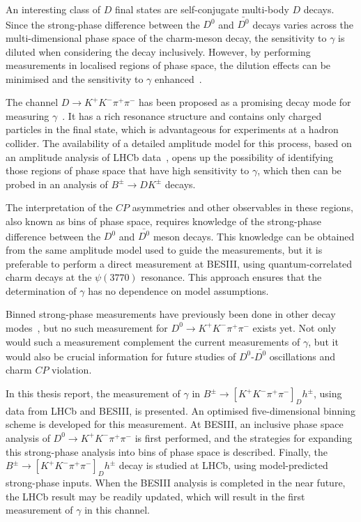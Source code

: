 \documentclass[12pt, a4paper, notitlepage, onecolumn]{article}
\begin{document}
An interesting class of $D$ final states are self-conjugate multi-body $D$ decays. Since the strong-phase difference between the $D^0$ and $\bar{D^0}$ decays varies across the multi-dimensional phase space of the charm-meson decay, the sensitivity to $\gamma$ is diluted when considering the decay inclusively. However, by performing measurements in localised regions of phase space, the dilution effects can be minimised and the sensitivity to $\gamma$ enhanced~\cite{BondarPoluektov2008,GiriGrossmanSofferZupan}.

The channel $D\to K^+K^-\pi^+\pi^-$ has been proposed as a promising decay mode for measuring $\gamma$~\cite{cite:RademackerWilkinson}. It has a rich resonance structure and contains only charged particles in the final state, which is advantageous for experiments at a hadron collider. The availability of a detailed amplitude model for this process, based on an amplitude analysis of LHCb data~\cite{LHCb-PAPER-2018-041}, opens up the possibility of identifying those regions of phase space that have high sensitivity to $\gamma$, which then can be probed in an analysis of $B^\pm\to DK^\pm$ decays.

The interpretation of the $C\!P$ asymmetries and other observables in these regions, also known as bins of phase space, requires knowledge of the strong-phase difference between the $D^0$ and $\bar{D^0}$ meson decays. This knowledge can be obtained from the same amplitude model used to guide the measurements, but it is preferable to perform a direct measurement at BESIII, using quantum-correlated charm decays at the $\psi(3770)$ resonance. This approach ensures that the determination of $\gamma$ has no dependence on model assumptions. 

Binned strong-phase measurements have previously been done in other decay modes~\cite{LHCb-PAPER-2020-019}, but no such measurement for $D^0\to K^+K^-\pi^+\pi^-$ exists yet. Not only would such a measurement complement the current measurements of $\gamma$, but it would also be crucial information for future studies of $D^0$-$\bar{D^0}$ oscillations and charm $C\!P$ violation.

In this thesis report, the measurement of $\gamma$ in $B^\pm\to[K^+K^-\pi^+\pi^-]_Dh^\pm$, using data from LHCb and BESIII, is presented. An optimised five-dimensional binning scheme is developed for this measurement. At BESIII, an inclusive phase space analysis of $D^0\to K^+K^-\pi^+\pi^-$ is first performed, and the strategies for expanding this strong-phase analysis into bins of phase space is described. Finally, the $B^\pm\to[K^+K^-\pi^+\pi^-]_Dh^\pm$ decay is studied at LHCb, using model-predicted strong-phase inputs. When the BESIII analysis is completed in the near future, the LHCb result may be readily updated, which will result in the first measurement of $\gamma$ in this channel.
\end{document}
